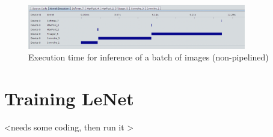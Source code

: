 \begin{figure}[h!]
\centering
\includegraphics[width=0.85\textwidth]{Figures/nonpipebatch}
\decoRule
\caption[nonpipebatch]{ Execution time for inference of a batch of images (non-pipelined)}
\label{fig:nonpipebatch}
\end{figure}


\newpage
\section{Training LeNet}

<needs some coding, then run it > 

